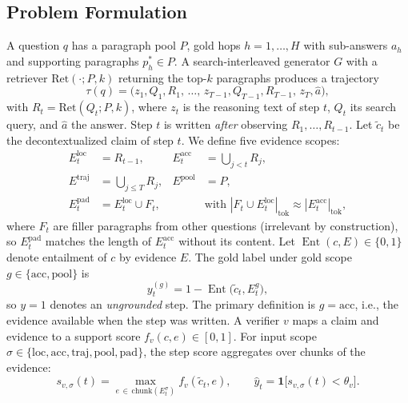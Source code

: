 \documentclass[conference]{IEEEtran}
\newcommand{\Eloc}{E^{\mathrm{loc}}}
\newcommand{\Eacc}{E^{\mathrm{acc}}}
\newcommand{\Etraj}{E^{\mathrm{traj}}}
\newcommand{\Epool}{E^{\mathrm{pool}}}
\newcommand{\Epad}{E^{\mathrm{pad}}}
\newcommand{\ctil}{\tilde{c}}
\newcommand{\Ent}{\operatorname{Ent}}
\begin{document}
\subsection{Problem Formulation}\label{sec:formulation}
A question $q$ has a paragraph pool $P$, gold hops $h=1,\dots,H$ with sub-answers $a_h$ and supporting paragraphs $p_h^{*}\in P$. A search-interleaved generator $G$ with a retriever $\mathrm{Ret}(\cdot;P,k)$ returning the top-$k$ paragraphs produces a trajectory
\begin{equation}
\tau(q) = \big(z_1, Q_1, R_1,\, \dots,\, z_{T-1}, Q_{T-1}, R_{T-1},\, z_T, \hat{a}\big),
\end{equation}
with $R_t = \mathrm{Ret}(Q_t;P,k)$,
where $z_t$ is the reasoning text of step $t$, $Q_t$ its search query, and $\hat{a}$ the answer. Step $t$ is written \emph{after} observing $R_1,\dots,R_{t-1}$. Let $\ctil_t$ be the decontextualized claim of step $t$. We define five evidence scopes:
\begin{align}
\Eloc_t &= R_{t-1}, & \Eacc_t &= \textstyle\bigcup_{j<t} R_j, \nonumber\\
\Etraj &= \textstyle\bigcup_{j\le T} R_j, & \Epool &= P, \label{eq:scopes}\\
\Epad_t &= \Eloc_t \cup F_t, & &\text{with } |F_t \cup \Eloc_t|_{\mathrm{tok}} \approx |\Eacc_t|_{\mathrm{tok}}, \nonumber
\end{align}
where $F_t$ are filler paragraphs from other questions (irrelevant by construction), so $\Epad_t$ matches the length of $\Eacc_t$ without its content. Let $\Ent(c,E)\in\{0,1\}$ denote entailment of $c$ by evidence $E$. The gold label under gold scope $g\in\{\mathrm{acc},\mathrm{pool}\}$ is
\begin{equation}\label{eq:gold}
y_t^{(g)} = 1 - \Ent\big(\ctil_t, E_t^{g}\big),
\end{equation}
so $y=1$ denotes an \emph{ungrounded} step. The primary definition is $g=\mathrm{acc}$, i.e., the evidence available when the step was written. A verifier $v$ maps a claim and evidence to a support score $f_v(c,e)\in[0,1]$. For input scope $\sigma\in\{\mathrm{loc},\mathrm{acc},\mathrm{traj},\mathrm{pool},\mathrm{pad}\}$, the step score aggregates over chunks of the evidence:
\begin{equation}\label{eq:score}
s_{v,\sigma}(t) = \max_{e\,\in\,\mathrm{chunk}(E_t^{\sigma})} f_v(\ctil_t, e),
\qquad \hat{y}_t = \mathbf{1}\big[s_{v,\sigma}(t) < \theta_v\big].
\end{equation}
\end{document}
